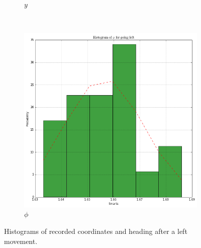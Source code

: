 \documentclass[paper=a4, fontsize=11pt]{scrartcl} %
\begin{document}
\begin{figure}[h!]
\begin{subfigure}[b]{0.3\textwidth}
        \caption{$y$}
    \end{subfigure}
    ~
    \begin{subfigure}[b]{0.3\textwidth}
        \setlength{\fboxsep}{0.5pt} %
        \setlength{\fboxrule}{0.5pt}
        \includegraphics[width=\textwidth,fbox]{images/histogram_4_phi_left.png}
        \caption{$\phi$}
    \end{subfigure}
    \caption{Histograms of recorded coordinates and heading after a left movement.}
\end{figure}

\newpage
\end{document}
